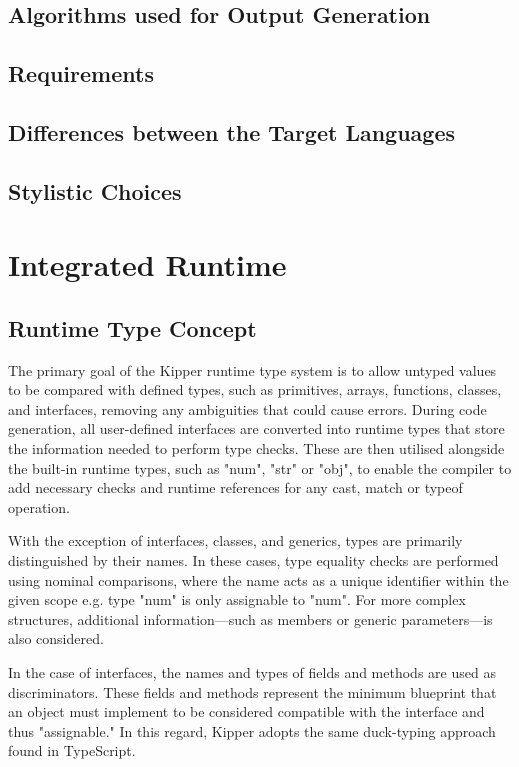 \subsection{Algorithms used for Output Generation}

\subsection{Requirements}

\subsection{Differences between the Target Languages}

\subsection{Stylistic Choices}

\section{Integrated Runtime}
\label{sec:integrated-runtime}

\subsection{Runtime Type Concept}

The primary goal of the Kipper runtime type system is to allow untyped values to be compared with defined types, such as primitives, arrays, functions, classes, and interfaces, removing any ambiguities that could cause errors. During code generation, all user-defined interfaces are converted into runtime types that store the information needed to perform type checks. These are then utilised alongside the built-in runtime types, such as "num", "str" or "obj", to enable the compiler to add necessary checks and runtime references for any cast, match or typeof operation.

With the exception of interfaces, classes, and generics, types are primarily distinguished by their names. In these cases, type equality checks are performed using nominal comparisons, where the name acts as a unique identifier within the given scope e.g. type "num" is only assignable to "num". For more complex structures, additional information—such as members or generic parameters—is also considered.

In the case of interfaces, the names and types of fields and methods are used as discriminators. These fields and methods represent the minimum blueprint that an object must implement to be considered compatible with the interface and thus "assignable." In this regard, Kipper adopts the same duck-typing approach found in TypeScript.

